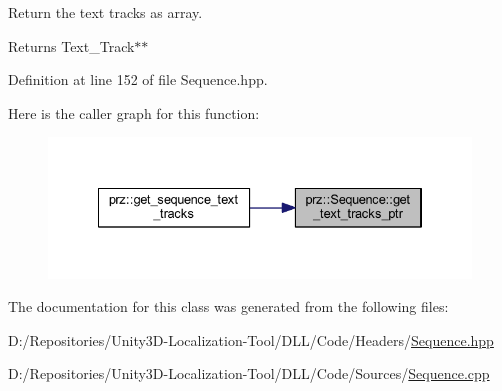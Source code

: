Return the text tracks as array. 

\begin{DoxyReturn}{Returns}
Text\+\_\+\+Track$\ast$$\ast$ 
\end{DoxyReturn}


Definition at line 152 of file Sequence.\+hpp.

Here is the caller graph for this function\+:
\nopagebreak
\begin{figure}[H]
\begin{center}
\leavevmode
\includegraphics[width=334pt]{classprz_1_1_sequence_af987ebf568d1a5ab5d589f9a0e7746c9_icgraph}
\end{center}
\end{figure}


The documentation for this class was generated from the following files\+:\begin{DoxyCompactItemize}
\item 
D\+:/\+Repositories/\+Unity3\+D-\/\+Localization-\/\+Tool/\+D\+L\+L/\+Code/\+Headers/\mbox{\hyperlink{_sequence_8hpp}{Sequence.\+hpp}}\item 
D\+:/\+Repositories/\+Unity3\+D-\/\+Localization-\/\+Tool/\+D\+L\+L/\+Code/\+Sources/\mbox{\hyperlink{_sequence_8cpp}{Sequence.\+cpp}}\end{DoxyCompactItemize}
